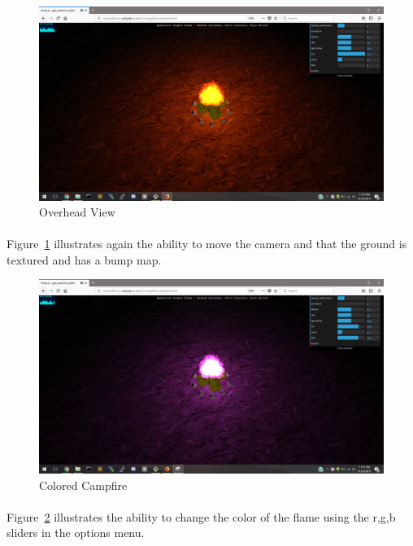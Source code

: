 \documentclass[letterpaper]{article}
\begin{document}
\begin{figure}[H]
\centering
\includegraphics[scale=.35]{result3.JPG}
\caption{Overhead View}
\label{fig:result3}
\end{figure}
\paragraph{}
Figure~\ref{fig:result3} illustrates again the ability to move the camera and that the ground is textured and has a bump map.

\begin{figure}[H]
\centering
\includegraphics[scale=.35]{result4.JPG}
\caption{Colored Campfire}
\label{fig:result4}
\end{figure}
\paragraph{}
Figure~\ref{fig:result4} illustrates the ability to change the color of the flame using the r,g,b sliders in the options menu.
\end{document}
